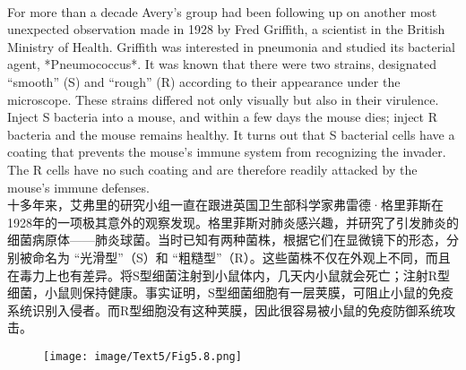 \documentclass{article}
\begin{document}
\\
For more than a decade Avery’s group had been following up on another most unexpected observation made in 1928 by Fred Griffith, a scientist in the British Ministry of Health. Griffith was interested in pneumonia and studied its bacterial agent, *Pneumococcus*. It was known that there were two strains, designated “smooth” (S) and “rough” (R) according to their appearance under the microscope. These strains differed not only visually but also in their virulence. Inject S bacteria into a mouse, and within a few days the mouse dies; inject R bacteria and the mouse remains healthy. It turns out that S bacterial cells have a coating that prevents the mouse’s immune system from recognizing the invader. The R cells have no such coating and are therefore readily attacked by the mouse’s immune defenses.\\
十多年来，艾弗里的研究小组一直在跟进英国卫生部科学家弗雷德·格里菲斯在1928年的一项极其意外的观察发现。格里菲斯对肺炎感兴趣，并研究了引发肺炎的细菌病原体——肺炎球菌。当时已知有两种菌株，根据它们在显微镜下的形态，分别被命名为 “光滑型”（S）和 “粗糙型”（R）。这些菌株不仅在外观上不同，而且在毒力上也有差异。将S型细菌注射到小鼠体内，几天内小鼠就会死亡；注射R型细菌，小鼠则保持健康。事实证明，S型细菌细胞有一层荚膜，可阻止小鼠的免疫系统识别入侵者。而R型细胞没有这种荚膜，因此很容易被小鼠的免疫防御系统攻击。 \\

\begin{figure}
    \centering
    \texttt{[image: image/Text5/Fig5.8.png]}
\end{figure}
\end{document}
